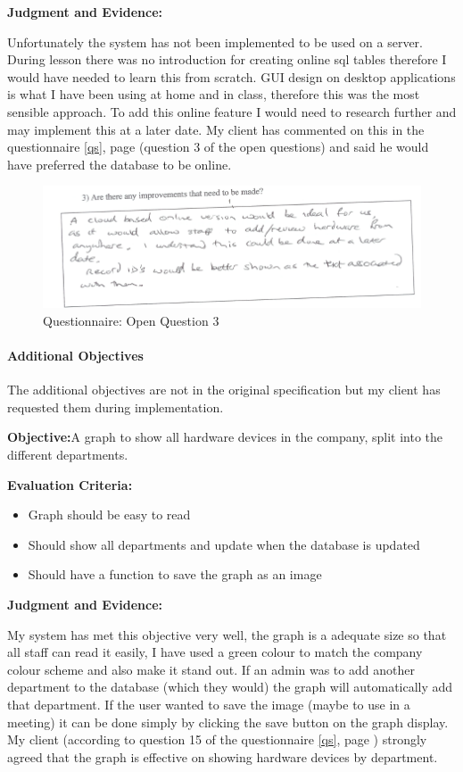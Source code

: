 \textbf{Judgment and Evidence:}

Unfortunately the system has not been implemented to be used on a server.  During lesson there was no introduction for creating online sql tables therefore I would have needed to learn this from scratch. GUI design on desktop applications is what I have been using at home and in class, therefore this was the most sensible approach. To add this online feature I would need to research further and may implement this at a later date. My client has commented on this in the questionnaire \ref{qs}, page \pageref{qs} (question 3 of the open questions) and said he would have preferred the database to be online.

\begin{figure}[H]
    \includegraphics[width=\textwidth]{./Evaluation/EvaluationQuestionnaire/o3.png}
    \caption{Questionnaire: Open Question 3} 
\end{figure}

\paragraph{Additional Objectives}

The additional objectives are not in the original specification but my client has requested them during implementation.

\textbf{Objective:}A graph to show all hardware devices in the company, split into the different departments.

\textbf{Evaluation Criteria:}
\begin{itemize}
\item{Graph should be easy to read}
\item{Should show all departments and update when the database is updated}
\item{Should have a function to save the graph as an image}
\end{itemize}

\textbf{Judgment and Evidence:}

My system has met this objective very well, the graph is a adequate size so that all staff can read it easily, I have used a green colour to match the company colour scheme and also make it stand out. If an admin was to add another department to the database (which they would) the graph will automatically add that department. If the user wanted to save the image (maybe to use in a meeting) it can be done simply by clicking the save button on the graph display. My client (according to question 15 of the questionnaire \ref{qs}, page \pageref{qs}) strongly agreed that the graph is effective on showing hardware devices by department.

